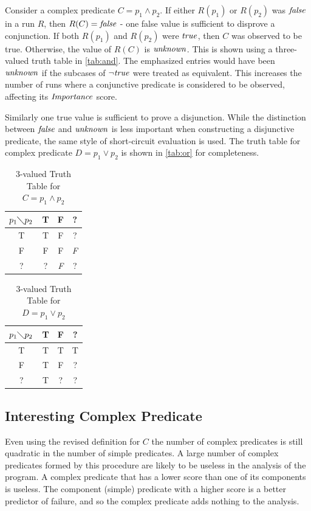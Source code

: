 Consider a complex predicate $C = p_1 \wedge p_2$.  If either $R(p_1)$ or $R(p_2)$ was $\mathit{false}$ in a run $R$, then $R(C) = \mathit{false}$ - one false value is sufficient to disprove a conjunction.  If both $R(p_1)$ and $R(p_2)$ were $\mathit{true}$, then $C$ was observed to be true.  Otherwise, the value of $R(C)$ is $\mathit{unknown}$. This is shown using a three-valued truth table in \autoref{tab:and}.  The emphasized entries would have been $\mathit{unknown}$ if the subcases of $\neg \mathit{true}$ were treated as equivalent.  This increases the number of runs where a conjunctive predicate is considered to be observed, affecting its $\mathit{Importance}$ score.

Similarly one true value is sufficient to prove a disjunction.  While the distinction between $\mathit{false}$ and $\mathit{unknown}$ is less important when constructing a disjunctive predicate, the same style of short-circuit evaluation is used.  The truth table for complex predicate $D = p_1 \vee p_2$ is shown in \autoref{tab:or} for completeness.

\begin{table}
  \caption{3-valued Truth Table for $C = p_1 \wedge p_2$}
  \label{tab:and}
  \centering
  \begin{tabular}{c|ccc}
    $p_1 \diagdown p_2$ & T & F & ? \\
    \hline
    T & T & F & ? \\
    F & F & F & \emph{F} \\
    ? & ? & \emph{F} & ? \\
  \end{tabular}
\end{table}


\begin{table}
  \caption{3-valued Truth Table for $D = p_1 \vee p_2$}
  \label{tab:or}
  \centering
  \begin{tabular}{c|ccc}
    $p_1 \diagdown p_2$ & T & F & ? \\
    \hline
    T & T & T & T \\
    F & T & F & ? \\
    ? & T & ? & ? \\
  \end{tabular}
\end{table}

\subsection{Interesting Complex Predicate}
Even using the revised definition for $C$ the number of complex predicates is still quadratic in the number of simple predicates.  A large number of complex predicates formed by this procedure are likely to be useless in the analysis of the program.  A complex predicate that has a lower score than one of its components is useless.  The component (simple) predicate with a higher score is a better predictor of failure, and so the complex predicate adds nothing to the analysis.

